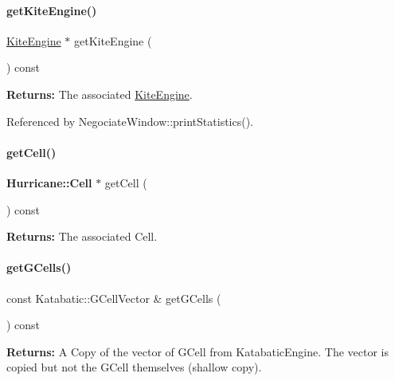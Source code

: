 \paragraph{\texorpdfstring{get\+Kite\+Engine()}{getKiteEngine()}}
{\footnotesize\ttfamily \mbox{\hyperlink{classKite_1_1KiteEngine}{Kite\+Engine}} $\ast$ get\+Kite\+Engine (\begin{DoxyParamCaption}{ }\end{DoxyParamCaption}) const\hspace{0.3cm}{\ttfamily [inline]}}

{\bfseries Returns\+:} The associated \mbox{\hyperlink{classKite_1_1KiteEngine}{Kite\+Engine}}. 

Referenced by Negociate\+Window\+::print\+Statistics().

\mbox{\label{classKite_1_1NegociateWindow_a5ea0f667687d3a832f8c9806ccbe6792}} 
\paragraph{\texorpdfstring{get\+Cell()}{getCell()}}
{\footnotesize\ttfamily \textbf{ Hurricane\+::\+Cell} $\ast$ get\+Cell (\begin{DoxyParamCaption}{ }\end{DoxyParamCaption}) const}

{\bfseries Returns\+:} The associated Cell. \mbox{\label{classKite_1_1NegociateWindow_ad8902daa6817d4275be5e3a37eb24424}} 
\paragraph{\texorpdfstring{get\+G\+Cells()}{getGCells()}}
{\footnotesize\ttfamily const Katabatic\+::\+G\+Cell\+Vector \& get\+G\+Cells (\begin{DoxyParamCaption}{ }\end{DoxyParamCaption}) const\hspace{0.3cm}{\ttfamily [inline]}}

{\bfseries Returns\+:} A Copy of the vector of G\+Cell from Katabatic\+Engine. The vector is copied but not the G\+Cell themselves (shallow copy). \mbox{\label{classKite_1_1NegociateWindow_a80fc29623500b168c49ba14c49a00a76}} 
